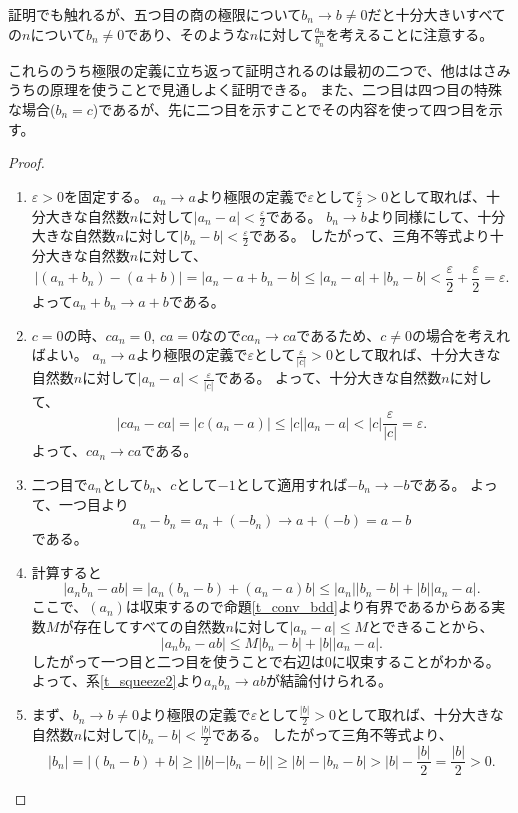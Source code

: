 \begin{remark}
証明でも触れるが、五つ目の商の極限について$b_n \to b \ne 0$だと十分大きいすべての$n$について$b_n \ne 0$であり、そのような$n$に対して$\frac{a_n}{b_n}$を考えることに注意する。
\end{remark}

これらのうち極限の定義に立ち返って証明されるのは最初の二つで、他ははさみうちの原理を使うことで見通しよく証明できる。
また、二つ目は四つ目の特殊な場合($b_n = c$)であるが、先に二つ目を示すことでその内容を使って四つ目を示す。

\begin{proof}
\begin{enumerate}
\item
$\varepsilon > 0$を固定する。
$a_n \to a$より極限の定義で$\varepsilon$として$\frac{\varepsilon}{2} > 0$として取れば、十分大きな自然数$n$に対して$|a_n-a| < \frac{\varepsilon}{2}$である。
$b_n \to b$より同様にして、十分大きな自然数$n$に対して$|b_n-b| < \frac{\varepsilon}{2}$である。
したがって、三角不等式より十分大きな自然数$n$に対して、
$$
|(a_n+b_n)-(a+b)| = |a_n-a+b_n-b| \le |a_n-a|+|b_n-b| < \frac{\varepsilon}{2}+\frac{\varepsilon}{2} = \varepsilon.
$$
よって$a_n+b_n \to a+b$である。
\item
$c = 0$の時、$c a_n = 0$, $c a = 0$なので$c a_n \to c a$であるため、$c \ne 0$の場合を考えればよい。
$a_n \to a$より極限の定義で$\varepsilon$として$\frac{\varepsilon}{|c|} > 0$として取れば、十分大きな自然数$n$に対して$|a_n-a| < \frac{\varepsilon}{|c|}$である。
よって、十分大きな自然数$n$に対して、
$$
|c a_n-c a| = |c(a_n-a)| \le |c||a_n-a| < |c|\frac{\varepsilon}{|c|} = \varepsilon.
$$
よって、$c a_n \to c a$である。
\item
二つ目で$a_n$として$b_n$、$c$として$-1$として適用すれば$-b_n \to -b$である。
よって、一つ目より
$$
a_n-b_n = a_n+(-b_n) \to a+(-b) = a-b
$$
である。
\item
計算すると
$$
|a_n b_n-a b| = |a_n(b_n-b)+(a_n-a)b| \le |a_n||b_n-b|+|b||a_n-a|.
$$
ここで、$(a_n)$は収束するので命題\ref{t_conv_bdd}より有界であるからある実数$M$が存在してすべての自然数$n$に対して$|a_n-a| \le M$とできることから、
$$
|a_n b_n-a b| \le M|b_n-b|+|b||a_n-a|.
$$
したがって一つ目と二つ目を使うことで右辺は$0$に収束することがわかる。
よって、系\ref{t_squeeze2}より$a_n b_n \to a b$が結論付けられる。
\item
まず、$b_n \to b \ne 0$より極限の定義で$\varepsilon$として$\frac{|b|}{2} > 0$として取れば、十分大きな自然数$n$に対して$|b_n-b| < \frac{|b|}{2}$である。
したがって三角不等式より、
$$
|b_n| = |(b_n-b)+b| \ge ||b|-|b_n-b|| \ge |b|-|b_n-b| > |b|-\frac{|b|}{2} = \frac{|b|}{2} > 0.
$$
\end{enumerate}
\end{proof}
